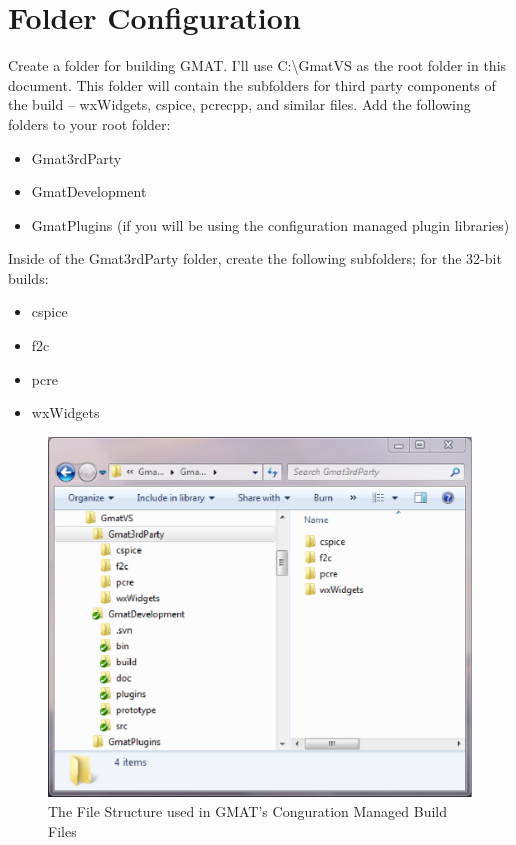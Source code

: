 \documentclass[letterpaper,10pt]{article}%
\begin{document}
\section{Folder Configuration}

Create a folder for building GMAT.  I'll use C:\textbackslash GmatVS as the root folder in this document.  This folder will contain the subfolders for third party components of the build -- wxWidgets, cspice, pcrecpp, and similar files.  Add the following folders to your root folder:
\begin{itemize}
\item Gmat3rdParty
\item GmatDevelopment
\item GmatPlugins (if you will be using the configuration managed plugin libraries)
\end{itemize}

\noindent Inside of the Gmat3rdParty folder, create the following subfolders; for the 32-bit builds:
\begin{itemize}
\item cspice
\item f2c
\item pcre
\item wxWidgets
\end{itemize}

\begin{figure}
\centering
\includegraphics{FolderStructure.eps}
\caption{The File Structure used in GMAT's Conguration Managed Build Files}
\label{fig:FolderStructure}
\end{figure}
\end{document}
